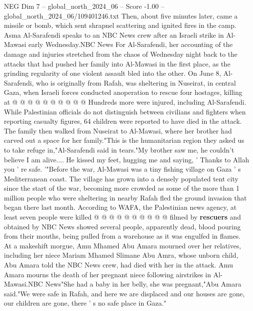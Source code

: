 \begin{textsample}{NEG Dim 7 – global\_north\_2024\_06 – Score -1.00 – global\_north\_2024\_06/109401246.txt}
Then, about five minutes later, came a missile or bomb, which sent shrapnel scattering and ignited fires in the camp.
Asma Al-Sarafendi speaks to an NBC News crew after an Israeli strike in Al-Mawasi early Wednesday.NBC News For Al-Sarafendi, her accounting of the damage and injuries stretched from the chaos of Wednesday night back to the attacks that had pushed her family into Al-Mawasi in the first place, as the grinding regularity of one violent assault bled into the other.
On June 8, Al-Sarafendi, who is originally from Rafah, was sheltering in Nuseirat, in central Gaza, when Israeli forces conducted anoperation to rescue four hostages, killing at @ @ @ @ @ @ @ @ @ @ Hundreds more were injured, including Al-Sarafendi.
While Palestinian officials do not distinguish between civilians and fighters when reporting casualty figures, 64 children were reported to have died in the attack.
The family then walked from Nuseirat to Al-Mawasi, where her brother had carved out a space for her family."This is the humanitarian region they asked us to take refuge in,"Al-Sarafendi said in tears."My brother saw me, he couldn't believe I am alive....
He kissed my feet, hugging me and saying, ' Thanks to Allah you ' re safe. '"Before the war, Al-Mawasi was a tiny fishing village on Gaza ' s Mediterranean coast.
The village has grown into a densely populated tent city since the start of the war, becoming more crowded as some of the more than 1 million people who were sheltering in nearby Rafah fled the ground invasion that began there last month.
According to WAFA, the Palestinian news agency, at least seven people were killed @ @ @ @ @ @ @ @ @ @ filmed by \textbf{rescuers} and obtained by NBC News showed several people, apparently dead, blood pouring from their mouths, being pulled from a warehouse as it was engulfed in flames.
At a makeshift morgue, Amu Mhamed Abu Amara mourned over her relatives, including her niece Mariam Mhamed Slimane Abu Amra, whose unborn child, Abu Amara told the NBC News crew, had died with her in the attack.
Amu Amara mourns the death of her pregnant niece following airstrikes in Al-Mawasi.NBC News"She had a baby in her belly, she was pregnant,"Abu Amara said."We were safe in Rafah, and here we are displaced and our houses are gone, our children are gone, there ' s no safe place in Gaza."

\end{textsample}
